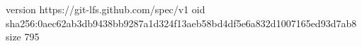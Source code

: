 version https://git-lfs.github.com/spec/v1
oid sha256:0aec62ab3db9438bb9287a1d324f13aeb58bd4df5e6a832d1007165ed93d7ab8
size 795
